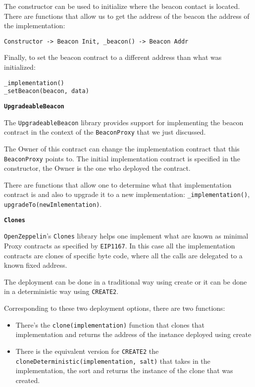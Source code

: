 The constructor can be used to initialize where the beacon contact is
located. There are functions that allow us to get the address of the
beacon the address of the implementation:

\begin{lstlisting}[language=Solidity,numbers=none]
Constructor -> Beacon Init, _beacon() -> Beacon Addr
\end{lstlisting}

Finally, to set the beacon contract to a different address than what was
initialized:

\begin{lstlisting}[language=Solidity,numbers=none]
_implementation()
_setBeacon(beacon, data)
\end{lstlisting}

\textbf{\texttt{UpgradeableBeacon}}

The \texttt{UpgradeableBeacon} library provides support for implementing
the beacon contract in the context of the \texttt{BeaconProxy} that we
just discussed.

The Owner of this contract can change the implementation contract that
this \texttt{BeaconProxy} points to. The initial implementation contract
is specified in the constructor, the Owner is the one who deployed the
contract.

There are functions that allow one to determine what that implementation
contract is and also to upgrade it to a new implementation:
\texttt{\_implementation()}, \texttt{upgradeTo(newImlementation)}.

\textbf{\texttt{Clones}}

\texttt{OpenZeppelin}'s \texttt{Clones} library helps one implement what
are known as minimal Proxy contracts as specified by \texttt{EIP1167}.
In this case all the implementation contracts are clones of specific
byte code, where all the calls are delegated to a known fixed address.

The deployment can be done in a traditional way using create or it can
be done in a deterministic way using \texttt{CREATE2}.

Corresponding to these two deployment options, there are two functions:

\begin{itemize}
\tightlist
\item
  There's the \texttt{clone(implementation)} function that clones that
  implementation and returns the address of the instance deployed using
  create
\item
  There is the equivalent version for \texttt{CREATE2} the
  \texttt{cloneDeterministic(implementation,\ salt)} that takes in the
  implementation, the sort and returns the instance of the clone that
  was created.
\end{itemize}

